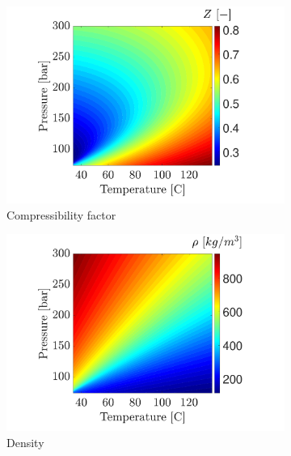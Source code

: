 \documentclass[../Article_Model_Parameters.tex]{subfiles}
\begin{document}
	\begin{figure}[H]
		\begin{subfigure}[b]{0.32\textwidth}
			\centering
			\includegraphics[trim = 3.5cm 0cm 1.5cm 0cm,clip,width=\textwidth]{Figures/Compressibility.pdf}	
			\caption{Compressibility factor}
			\label{fig: SFE_Properties_Compressibility}
		\end{subfigure}
		\hfill
		\begin{subfigure}[b]{0.32\textwidth}
			\centering
			\includegraphics[trim = 3.5cm 0cm 1.5cm 0cm,clip,width=\textwidth]{Figures/RHO.pdf}	
			\caption{Density}
			\label{fig: SFE_Properties_Density}
		\end{subfigure}
		\hfill
		\begin{subfigure}[b]{0.32\textwidth}
			\centering

\end{subfigure}
\end{figure}
\end{document}
